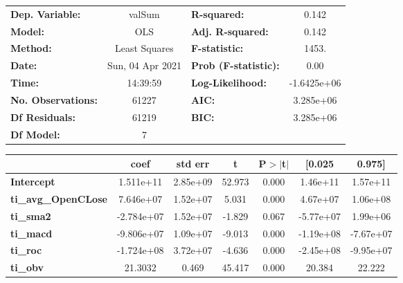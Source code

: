 \begin{center}
\begin{tabular}{lclc}
\toprule
\textbf{Dep. Variable:}     &      valSum      & \textbf{  R-squared:         } &      0.142   \\
\textbf{Model:}             &       OLS        & \textbf{  Adj. R-squared:    } &      0.142   \\
\textbf{Method:}            &  Least Squares   & \textbf{  F-statistic:       } &      1453.   \\
\textbf{Date:}              & Sun, 04 Apr 2021 & \textbf{  Prob (F-statistic):} &      0.00    \\
\textbf{Time:}              &     14:39:59     & \textbf{  Log-Likelihood:    } & -1.6425e+06  \\
\textbf{No. Observations:}  &       61227      & \textbf{  AIC:               } &  3.285e+06   \\
\textbf{Df Residuals:}      &       61219      & \textbf{  BIC:               } &  3.285e+06   \\
\textbf{Df Model:}          &           7      & \textbf{                     } &              \\
\bottomrule
\end{tabular}
\begin{tabular}{lcccccc}
                            & \textbf{coef} & \textbf{std err} & \textbf{t} & \textbf{P$> |$t$|$} & \textbf{[0.025} & \textbf{0.975]}  \\
\midrule
\textbf{Intercept}          &    1.511e+11  &     2.85e+09     &    52.973  &         0.000        &     1.46e+11    &     1.57e+11     \\
\textbf{ti\_avg\_OpenCLose} &    7.646e+07  &     1.52e+07     &     5.031  &         0.000        &     4.67e+07    &     1.06e+08     \\
\textbf{ti\_sma2}           &   -2.784e+07  &     1.52e+07     &    -1.829  &         0.067        &    -5.77e+07    &     1.99e+06     \\
\textbf{ti\_macd}           &   -9.806e+07  &     1.09e+07     &    -9.013  &         0.000        &    -1.19e+08    &    -7.67e+07     \\
\textbf{ti\_roc}            &   -1.724e+08  &     3.72e+07     &    -4.636  &         0.000        &    -2.45e+08    &    -9.95e+07     \\
\textbf{ti\_obv}            &      21.3032  &        0.469     &    45.417  &         0.000        &       20.384    &       22.222     \\

\end{tabular}
\end{center}

